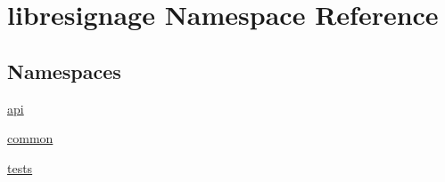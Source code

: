 \hypertarget{namespacelibresignage}{}\section{libresignage Namespace Reference}
\label{namespacelibresignage}
\subsection*{Namespaces}
\begin{DoxyCompactItemize}
\item 
 \hyperlink{namespacelibresignage_1_1api}{api}
\item 
 \hyperlink{namespacelibresignage_1_1common}{common}
\item 
 \hyperlink{namespacelibresignage_1_1tests}{tests}
\end{DoxyCompactItemize}
